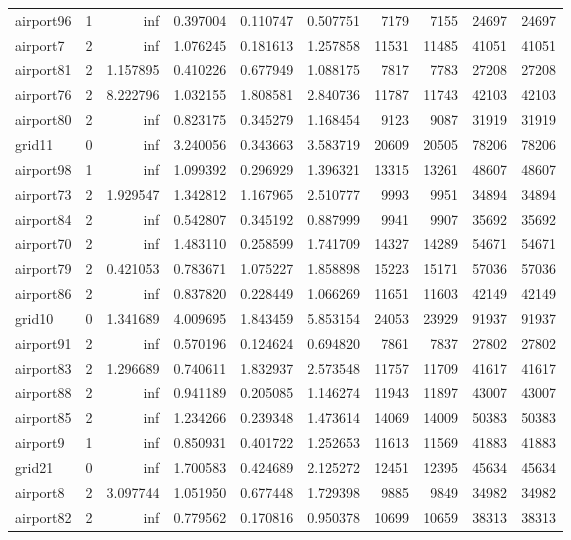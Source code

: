 \begin{longtable}{|l|r|r|r|r|r|r|r|r|r|}
airport96 & 1 & inf & 0.397004 & 0.110747 & 0.507751 & 7179 & 7155 & 24697 & 24697 \\
airport7 & 2 & inf & 1.076245 & 0.181613 & 1.257858 & 11531 & 11485 & 41051 & 41051 \\
airport81 & 2 & 1.157895 & 0.410226 & 0.677949 & 1.088175 & 7817 & 7783 & 27208 & 27208 \\
airport76 & 2 & 8.222796 & 1.032155 & 1.808581 & 2.840736 & 11787 & 11743 & 42103 & 42103 \\
airport80 & 2 & inf & 0.823175 & 0.345279 & 1.168454 & 9123 & 9087 & 31919 & 31919 \\
grid11 & 0 & inf & 3.240056 & 0.343663 & 3.583719 & 20609 & 20505 & 78206 & 78206 \\
airport98 & 1 & inf & 1.099392 & 0.296929 & 1.396321 & 13315 & 13261 & 48607 & 48607 \\
airport73 & 2 & 1.929547 & 1.342812 & 1.167965 & 2.510777 & 9993 & 9951 & 34894 & 34894 \\
airport84 & 2 & inf & 0.542807 & 0.345192 & 0.887999 & 9941 & 9907 & 35692 & 35692 \\
airport70 & 2 & inf & 1.483110 & 0.258599 & 1.741709 & 14327 & 14289 & 54671 & 54671 \\
airport79 & 2 & 0.421053 & 0.783671 & 1.075227 & 1.858898 & 15223 & 15171 & 57036 & 57036 \\
airport86 & 2 & inf & 0.837820 & 0.228449 & 1.066269 & 11651 & 11603 & 42149 & 42149 \\
grid10 & 0 & 1.341689 & 4.009695 & 1.843459 & 5.853154 & 24053 & 23929 & 91937 & 91937 \\
airport91 & 2 & inf & 0.570196 & 0.124624 & 0.694820 & 7861 & 7837 & 27802 & 27802 \\
airport83 & 2 & 1.296689 & 0.740611 & 1.832937 & 2.573548 & 11757 & 11709 & 41617 & 41617 \\
airport88 & 2 & inf & 0.941189 & 0.205085 & 1.146274 & 11943 & 11897 & 43007 & 43007 \\
airport85 & 2 & inf & 1.234266 & 0.239348 & 1.473614 & 14069 & 14009 & 50383 & 50383 \\
airport9 & 1 & inf & 0.850931 & 0.401722 & 1.252653 & 11613 & 11569 & 41883 & 41883 \\
grid21 & 0 & inf & 1.700583 & 0.424689 & 2.125272 & 12451 & 12395 & 45634 & 45634 \\
airport8 & 2 & 3.097744 & 1.051950 & 0.677448 & 1.729398 & 9885 & 9849 & 34982 & 34982 \\
airport82 & 2 & inf & 0.779562 & 0.170816 & 0.950378 & 10699 & 10659 & 38313 & 38313 \\

\end{longtable}
